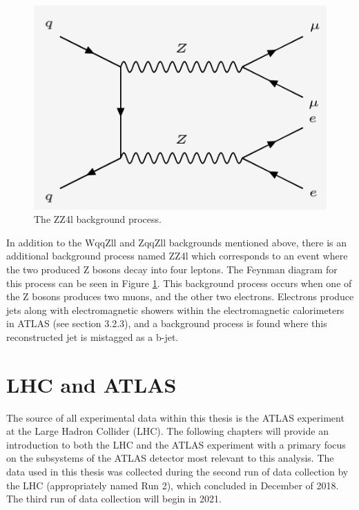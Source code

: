 \documentclass[12pt,a4paper,epsf,portrait,times,epsfig]{article}
\begin{document}
		\begin{figure}[h!]
			\centering
			\includegraphics[scale=0.45]{ZZ4l}
			\caption{The ZZ4l background process.}
			\label{Fig:ZZ4lFeynman}
		\end{figure}
		
		
		In addition to the WqqZll and ZqqZll backgrounds mentioned above, there is an additional background process named ZZ4l which corresponds to an event where the two produced Z bosons decay into four leptons. The Feynman diagram for this process can be seen in Figure \ref{Fig:ZZ4lFeynman}. This background process occurs when one of the Z bosons produces two muons, and the other two electrons. Electrons produce jets along with
		electromagnetic showers within the electromagnetic calorimeters in ATLAS (see section 3.2.3), and a background process is found where this reconstructed jet is mistagged as a b-jet. \par
		
	\section{LHC and ATLAS}

		The source of all experimental data within this thesis is the ATLAS experiment at the Large Hadron Collider (LHC). The following chapters will provide an introduction to both the LHC and the ATLAS experiment with a primary focus on the subsystems of the ATLAS detector most relevant to this analysis. The data used in this thesis was collected during the second run of data collection by the LHC (appropriately named Run 2), which concluded in December of 2018. The third run of data collection will begin in 2021. 
\end{document}
